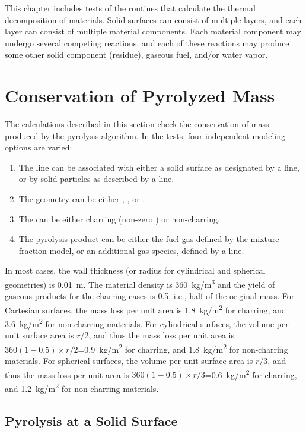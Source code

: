 \documentclass[11pt]{book}
\begin{document}
This chapter includes tests of the routines that calculate the thermal decomposition of materials. Solid surfaces can consist of multiple layers, and each layer can consist of multiple material components. Each material component may undergo several competing reactions, and each of these reactions may produce some other solid component (residue), gaseous fuel, and/or water vapor.

\section{Conservation of Pyrolyzed Mass}

The calculations described in this section check the conservation of mass produced by the pyrolysis algorithm. In the tests, four independent modeling options are varied:
\begin{enumerate}
\item The  line can be associated with either a solid surface as designated by a  line, or by solid particles as described by a  line.
\item The  geometry can be either , , or .
\item The  can be either charring (non-zero ) or non-charring.
\item The pyrolysis product can be either the fuel gas defined by the mixture fraction model, or an additional gas species, defined by a  line.
\end{enumerate}
In most cases, the wall thickness (or radius for cylindrical and spherical geometries) is 0.01~m. The material density is 360~\unit{kg/m^3} and the yield of gaseous products for the charring cases is 0.5, i.e., half of the original mass. For Cartesian surfaces, the mass loss per unit area is 1.8~\unit{kg/m^2} for charring, and 3.6~\unit{kg/m^2} for non-charring materials. For cylindrical surfaces, the volume per unit surface area is $r/2$, and thus the mass loss per unit area is $360(1-0.5) \times r/2$=0.9~\unit{kg/m^2} for charring, and 1.8~\unit{kg/m^2} for non-charring materials. For spherical surfaces, the volume per unit surface area is $r/3$, and thus the mass loss per unit area is $360(1-0.5) \times r/3$=0.6~\unit{kg/m^2} for charring, and 1.2~\unit{kg/m^2} for non-charring materials.


\subsection{Pyrolysis at a Solid Surface}
\label{surf_mass_vent_char_cart_fuel}
\label{surf_mass_vent_char_cart_gas}
\label{surf_mass_vent_char_cyl_fuel}
\label{surf_mass_vent_char_cyl_gas}
\label{surf_mass_vent_char_spher_fuel}
\label{surf_mass_vent_char_spher_gas}
\label{surf_mass_vent_nonchar_cart_fuel}
\label{surf_mass_vent_nonchar_cart_gas}
\label{surf_mass_vent_nonchar_cyl_fuel}
\label{surf_mass_vent_nonchar_cyl_gas}
\label{surf_mass_vent_nonchar_spher_fuel}
\label{surf_mass_vent_nonchar_spher_gas}
\end{document}
